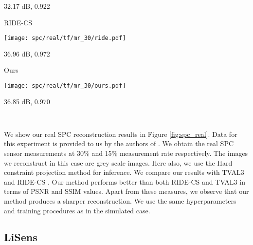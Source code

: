 \documentclass[journal,twoside]{IEEEtran}
\begin{document}
\begin{figure*}[!t]
\begin{minipage}{.999\textwidth}
\begin{minipage}{.20\textwidth}
\centerline{32.17 dB, 0.922}
\end{minipage}\hspace{0.1cm}
\begin{minipage}{.20\textwidth}
\centerline{RIDE-CS}
\vspace{0.1cm}
\texttt{[image: spc/real/tf/mr\_30/ride.pdf]}  
  
\centerline{36.96 dB, 0.972}
\end{minipage}\hspace{0.1cm}
\begin{minipage}{.20\textwidth}
\centerline{Ours}
\vspace{0.1cm}
\texttt{[image: spc/real/tf/mr\_30/ours.pdf]}  
\centerline{36.85 dB, 0.970}
\end{minipage}\\

\end{minipage}

\caption{Reconstructions from real Single Pixel Camera measurements at different measurement rates. Our approach recovers the low level details much better than TVAL3. Though the performance of RIDE-CS, which is also a deep autoregressive model, is similar to ours in this case, its computational complexity is much higher. Also in other simulation experiments we found RIDE-CS does not preserve fine details, see Figure \ref{fig:abalation_ride}.}
\label{fig:spc_real}
\end{figure*}

We show our real SPC reconstruction results in Figure \ref{fig:spc_real}. Data for this experiment is provided to us by the authors of \cite{wang2015lisens}. We obtain the real SPC sensor measurements at 30\% and 15\% measurement rate respectively. The images we reconstruct in this case are grey scale images. Here also, we use the Hard constraint projection method for inference. We compare our results with TVAL3 and RIDE-CS \cite{dave2017compressive}. Our method performs better than both RIDE-CS and TVAL3 in terms of PSNR and SSIM values. Apart from these measures, we observe that our method produces a sharper reconstruction. We use the same hyperparameters and training procedures as in the simulated case. 

\subsection{LiSens}
\end{document}
